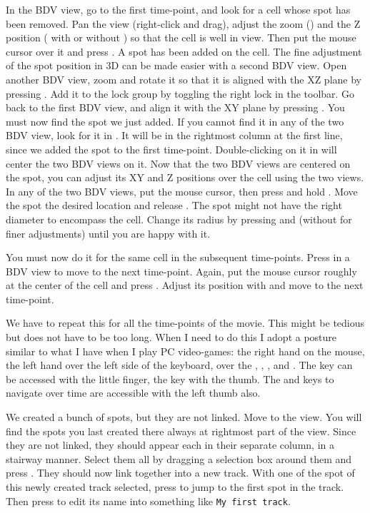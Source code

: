 In the BDV view, go to the first time-point, and look for a cell whose spot has been removed.
Pan the view (right-click and drag), adjust the zoom () and the Z position ( with or without \keys{\shift}) so that the cell is well in view.
Then put the mouse cursor over it and press .
A spot has been added on the cell.
The fine adjustment of the spot position in 3D can be made easier with a second BDV view.
Open another BDV view, zoom and rotate it so that it is aligned with the XZ plane by pressing .
Add it to the lock group by toggling the right lock  in the toolbar.
Go back to the first BDV view, and align it with the XY plane by pressing .
You must now find the spot we just added. 
If you cannot find it in any of the two BDV view, look for it in \TrackScheme.
It will be in the rightmost column at the first line, since we added the spot to the first time-point.
Double-clicking on it in \TrackScheme will center the two BDV views on it.
Now that the two BDV views are centered on the spot, you can adjust its XY and Z positions over the cell using the two views.
In any of the two BDV views, put the mouse cursor, then press and hold .
Move the spot the desired location and release .
The spot might not have the right diameter to encompass the cell.
Change its radius by pressing  and  (without \keys{\shift} for finer adjustments) until you are happy with it.

You must now do it for the same cell in the subsequent time-points.
Press  in a BDV view to move to the next time-point.
Again, put the mouse cursor roughly at the center of the cell and press .
Adjust its position with  and move to the next time-point.

We have to repeat this for all the time-points of the movie. 
This might be tedious but does not have to be too long. 
When I need to do this I adopt a posture similar to what I have when I play PC video-games: the right hand on the mouse, the left hand over the left side of the keyboard, over the , , , and .
The \keys{\shift} key can be accessed with the little finger, the  key with the thumb.
The  and  keys to navigate over time are accessible with the left thumb also.

We created a bunch of spots, but they are not linked. 
Move to the \TrackScheme view. 
You will find the spots you last created there always at rightmost part of the view.
Since they are not linked, they should appear each in their separate column, in a stairway manner. 
Select them all by dragging a selection box around them and press .
They should now link together into a new track.
With one of the spot of this newly created track selected, press \keys{\Alt+\arrowkeyup} to jump to the first spot in the track.
Then press \keys{\return} to edit its name into something like \texttt{My first track}.


